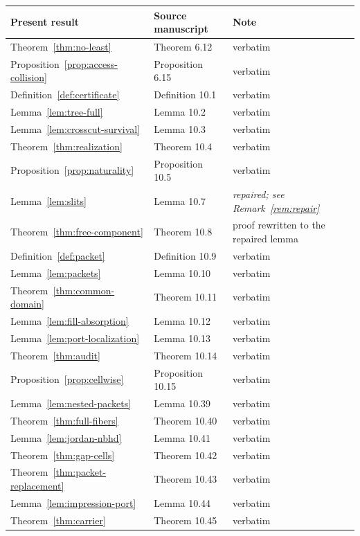 \documentclass[11pt,reqno]{amsart}
\theoremstyle{definition}
\theoremstyle{remark}
\begin{document}
\begin{center}
\begin{tabular}{lll}
\toprule
Present result & Source manuscript & Note\\
\midrule
Theorem~\ref{thm:no-least} & Theorem 6.12 & verbatim\\
Proposition~\ref{prop:access-collision} & Proposition 6.15 & verbatim\\
Definition~\ref{def:certificate} & Definition 10.1 & verbatim\\
Lemma~\ref{lem:tree-full} & Lemma 10.2 & verbatim\\
Lemma~\ref{lem:crosscut-survival} & Lemma 10.3 & verbatim\\
Theorem~\ref{thm:realization} & Theorem 10.4 & verbatim\\
Proposition~\ref{prop:naturality} & Proposition 10.5 & verbatim\\
Lemma~\ref{lem:slits} & Lemma 10.7 & \emph{repaired; see Remark~\ref{rem:repair}}\\
Theorem~\ref{thm:free-component} & Theorem 10.8 & proof rewritten to the repaired lemma\\
Definition~\ref{def:packet} & Definition 10.9 & verbatim\\
Lemma~\ref{lem:packets} & Lemma 10.10 & verbatim\\
Theorem~\ref{thm:common-domain} & Theorem 10.11 & verbatim\\
Lemma~\ref{lem:fill-absorption} & Lemma 10.12 & verbatim\\
Lemma~\ref{lem:port-localization} & Lemma 10.13 & verbatim\\
Theorem~\ref{thm:audit} & Theorem 10.14 & verbatim\\
Proposition~\ref{prop:cellwise} & Proposition 10.15 & verbatim\\
Lemma~\ref{lem:nested-packets} & Lemma 10.39 & verbatim\\
Theorem~\ref{thm:full-fibers} & Theorem 10.40 & verbatim\\
Lemma~\ref{lem:jordan-nbhd} & Lemma 10.41 & verbatim\\
Theorem~\ref{thm:gap-cells} & Theorem 10.42 & verbatim\\
Theorem~\ref{thm:packet-replacement} & Theorem 10.43 & verbatim\\
Lemma~\ref{lem:impression-port} & Lemma 10.44 & verbatim\\
Theorem~\ref{thm:carrier} & Theorem 10.45 & verbatim\\
\bottomrule
\end{tabular}
\end{center}
\end{document}
